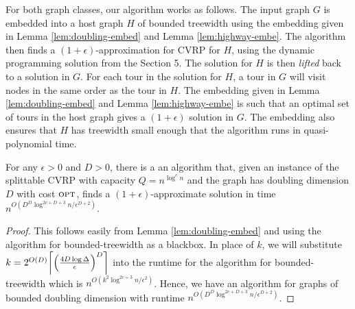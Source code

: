 \documentclass[twoside,leqno]{article}
\newcommand{\calT}{{\cal T}}
\newcommand{\opt}{\mbox{\sc opt}}
\newcommand{\OPT}{\mbox{\sc OPT}}
\newcommand{\eps}{\epsilon}
\DeclarePairedDelimiter\ceil{\lceil}{\rceil}
\newcommand{\cost}{\text{cost}}
\DeclarePairedDelimiter\autobracket{(}{)}
\newcommand{\br}[1]{\autobracket*{#1}}
\begin{document}
For both graph classes, our algorithm works as follows. The input graph $G$ is embedded into a host graph $H$ of bounded treewidth using the embedding given in Lemma \ref{lem:doubling-embed} and Lemma \ref{lem:highway-embe}. The algorithm then finds a $(1 + \eps)$-approximation for CVRP for $H$, using the dynamic programming solution from the Section 5. The solution for $H$ is then \emph{lifted} back to a solution in $G$. For each tour in the solution for $H$, a tour in $G$ will visit nodes in the same order as the tour in $H$. The embedding given in Lemma \ref{lem:doubling-embed} and Lemma \ref{lem:highway-embe} is such that an optimal set of tours in the host graph gives a $(1 + \eps)$ solution in $G$. The embedding also ensures that $H$ has treewidth small enough that the algorithm runs in quasi-polynomial time. \begin{comment}Suppose $\calT_1, \ldots, \calT_c$ are the set of tours in $\OPT$, let $E(\calT_i)$ be the edges denoting the order in which nodes are visited by $\calT_i$. Let $\cost(\calT_i)$ be the contribution of the tour $\calT_i$ towards $\opt$. We can write $\cost(\calT_i) = \sum_{uv \in E(\calT_i)} d(u,v)$ and we can write $\opt = \sum_{i = 1}^c \cost(\calT_i) = \sum_{i = 1}^c \sum_{uv \in E(\calT_i)} d(u,v)$. \end{comment}
\begin{theorem}
For any $\eps > 0$ and $D > 0$, there is a an algorithm that, given an instance of the splittable CVRP with capacity $Q = n^{\log^c n}$ and the graph has doubling dimension $D$ with cost $\opt$, finds a  
$(1 + \eps)$-approximate solution in time 
$n^{O(D^D \log^{2c + D + 3}n/\eps^{D+2})}$.
\end{theorem}
\begin{proof}
This follows easily from Lemma \ref{lem:doubling-embed} and using the algorithm for bounded-treewidth as a blackbox. In place of $k$, we will substitute $k = 2^{O(D)}\ceil*{\br{\frac{4D\log \Delta}{\eps}}^D}$ into the runtime for the algorithm for bounded-treewidth which is $n^{O(k^2 \log^{2c + 3}n/\eps^2)}$. Hence, we have an algorithm for graphs of bounded doubling dimension with runtime $n^{O(D^D \log^{2c + D + 3}n/\eps^{D+2})}$. 
\end{proof}
\end{document}
